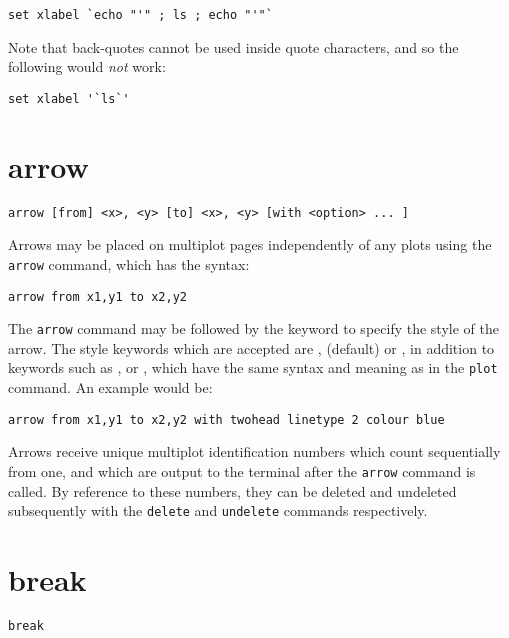 \begin{verbatim}
set xlabel `echo "'" ; ls ; echo "'"`
\end{verbatim}

\noindent Note that back-quotes cannot be used inside quote characters, and so
the following would \textit{not} work:

\begin{verbatim}
set xlabel '`ls`'
\end{verbatim}

\section{arrow}

\begin{verbatim}
arrow [from] <x>, <y> [to] <x>, <y> [with <option> ... ]
\end{verbatim}

Arrows may be placed on multiplot pages independently of any plots using the
{\tt arrow} command, which has the syntax:

\begin{verbatim}
arrow from x1,y1 to x2,y2
\end{verbatim}

The {\tt arrow} command may be followed by the  keyword to
specify the style of the arrow. The style keywords which are accepted are
,  (default) or , in addition to
keywords such as ,  or ,
which have the same syntax and meaning as in the {\tt plot} command. An example
would be:

\begin{verbatim}
arrow from x1,y1 to x2,y2 with twohead linetype 2 colour blue
\end{verbatim}

Arrows receive unique multiplot identification numbers which count sequentially
from one, and which are output to the terminal after the {\tt arrow} command is
called. By reference to these numbers, they can be deleted and undeleted
subsequently with the {\tt delete} and {\tt undelete} commands respectively.

\section{break}

\begin{verbatim}
break
\end{verbatim}

